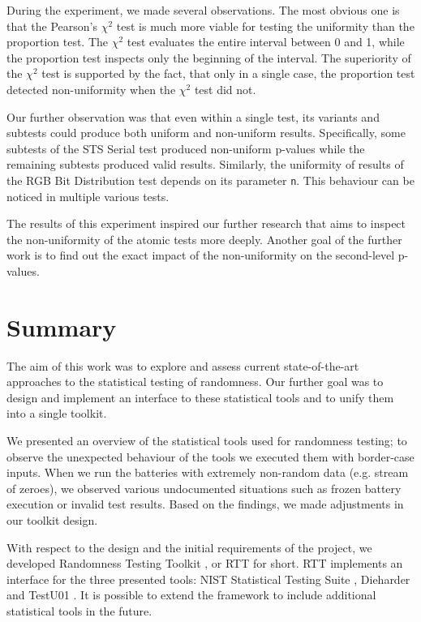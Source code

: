 \documentclass[
  digital,  	%
  color,		%
  oneside,   	%
  12pt,
  nocover,
  notable,
  nolof,
  nolot,
]{fithesis3}
\theoremstyle{definition}
\theoremstyle{remark}
\begin{document}
During the experiment, we made several observations. The most obvious one is that the Pearson's $\chi^2$ test is much more viable for testing the uniformity than the proportion test. The $\chi^2$ test evaluates the entire interval between 0 and 1, while the proportion test inspects only the beginning of the interval. The superiority of the $\chi^2$ test is supported by the fact, that only in a single case, the proportion test detected non-uniformity when the $\chi^2$ test did not. 

Our further observation was that even within a single test, its variants and subtests could produce both uniform and non-uniform results. Specifically, some subtests of the STS Serial test produced non-uniform p-values while the remaining subtests produced valid results. Similarly, the uniformity of results of the RGB Bit Distribution test depends on its parameter \texttt{n}. This behaviour can be noticed in multiple various tests.

The results of this experiment inspired our further research that aims to inspect the non-uniformity of the atomic tests more deeply. Another goal of the further work is to find out the exact impact of the non-uniformity on the second-level p-values.

\chapter{Summary}
\label{chap:summary}
The aim of this work was to explore and assess current state-of-the-art approaches to the statistical testing of randomness. Our further goal was to design and implement an interface to these statistical tools and to unify them into a single toolkit.

We presented an overview of the statistical tools used for randomness testing; to observe the unexpected behaviour of the tools we executed them with border-case inputs. When we run the batteries with extremely non-random data (e.g. stream of zeroes), we observed various undocumented situations such as frozen battery execution or invalid test results. Based on the findings, we made adjustments in our toolkit design. 

With respect to the design and the initial requirements of the project, we developed Randomness Testing Toolkit \cite{rtt-github}, or RTT for short. RTT implements an interface for the three presented tools: NIST Statistical Testing Suite \cite{nist-sts}, Dieharder \cite{dieharder} and TestU01 \cite{testu01-paper}. It is possible to extend the framework to include additional statistical tools in the future.
\end{document}
